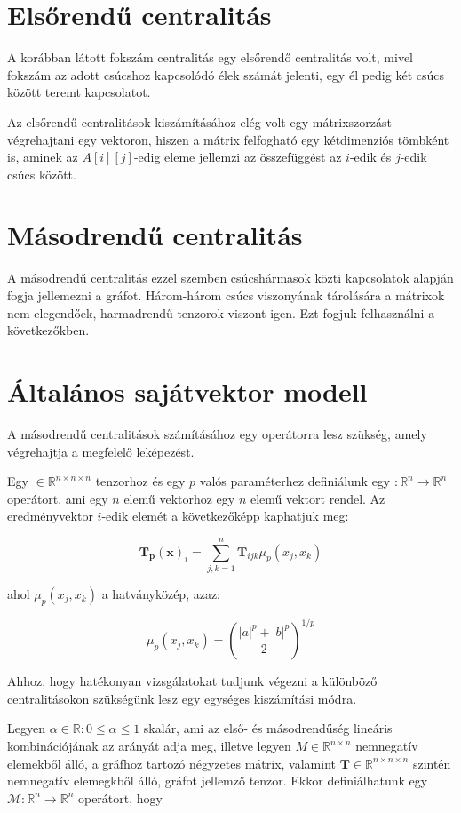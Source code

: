 \documentclass[12pt,numbers=noenddot]{report}
\begin{document}
\section{Elsőrendű centralitás}

A korábban látott fokszám centralitás egy elsőrendő centralitás volt,
mivel fokszám az adott csúcshoz kapcsolódó élek számát jelenti,
egy él pedig két csúcs között teremt kapcsolatot. 

Az elsőrendű centralitások kiszámításához elég volt egy mátrixszorzást 
végrehajtani egy vektoron, hiszen a mátrix felfogható egy kétdimenziós tömbként
is, aminek az $A[i][j]$-edig eleme jellemzi az összefüggést az $i$-edik és 
$j$-edik csúcs között.


\section{Másodrendű centralitás}

A másodrendű centralitás ezzel szemben csúcshármasok közti kapcsolatok alapján 
fogja jellemezni a gráfot. Három-három csúcs viszonyának tárolására a mátrixok 
nem elegendőek, harmadrendű tenzorok viszont igen.
Ezt fogjuk felhasználni a következőkben.


\section{Általános sajátvektor modell}

A másodrendű centralitások számításához egy operátorra lesz szükség, 
amely végrehajtja a megfelelő leképezést.

Egy \unboldmath $\in \mathbb{R}^{n \times n \times n}$ 
tenzorhoz és egy $p$ valós paraméterhez definiálunk egy 
\unboldmath $: \mathbb{R}^n \rightarrow \mathbb{R}^n$ operátort,
ami egy $n$ elemű vektorhoz egy $n$ elemű vektort rendel. 
Az eredményvektor $i$-edik elemét a következőképp kaphatjuk meg:

$$\boldsymbol{T_p}(\boldsymbol{x})_i = \sum_{j,k=1}^n \boldsymbol{T}_{ijk} 
\mu_p(x_j,x_k)$$

ahol $\mu_p(x_j,x_k)$ a hatványközép, azaz:

$$\mu_p(x_j,x_k) = \left(\frac{|a|^p+|b|^p}{2}\right)^{1/p}$$


Ahhoz, hogy hatékonyan vizsgálatokat tudjunk végezni a különböző 
centralitásokon szükségünk lesz egy egységes kiszámítási módra.

Legyen $\alpha \in \mathbb{R}: 0 \leq \alpha \leq 1$ skalár, ami az első- 
és másodrendűség lineáris kombinációjának az arányát adja meg,
illetve legyen $M \in \mathbb{R}^{n \times n}$ nemnegatív elemekből álló, 
a gráfhoz tartozó négyzetes mátrix, valamint $\boldsymbol{T} \in 
\mathbb{R}^{n \times n \times n}$ szintén nemnegatív elemegkből álló, 
gráfot jellemző tenzor. Ekkor definiálhatunk egy $\mathcal{M}: 
\mathbb{R}^n \rightarrow \mathbb{R}^n$ operátort, hogy
\end{document}
